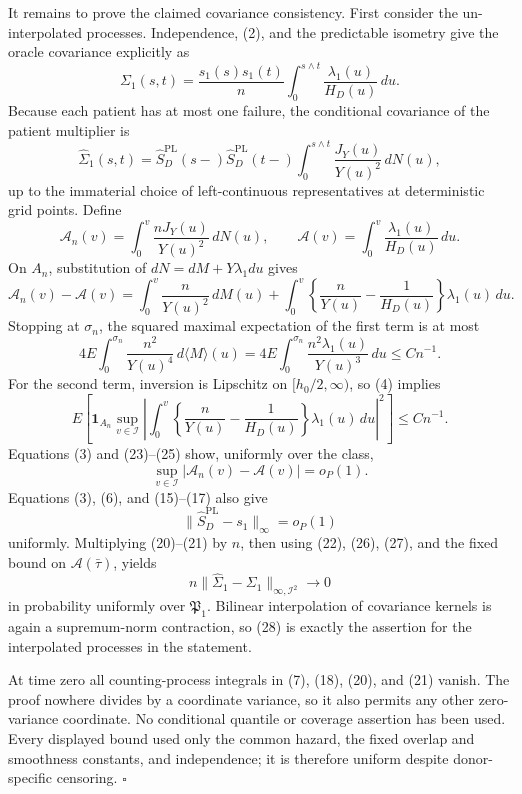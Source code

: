 It remains to prove the claimed covariance consistency.  First consider the un-interpolated processes.  Independence, (2), and the predictable isometry give the oracle covariance explicitly as
\[
 \Sigma_1(s,t)
 =\frac{s_1(s)s_1(t)}n
   \int_0^{s\wedge t}\frac{\lambda_1(u)}{H_D(u)}\,du.  \tag{20}
\]
Because each patient has at most one failure, the conditional covariance of the patient multiplier is
\[
 \widehat\Sigma_1(s,t)
 =\widehat S_D^{\mathrm{PL}}(s-)
  \widehat S_D^{\mathrm{PL}}(t-)
  \int_0^{s\wedge t}\frac{J_Y(u)}{Y(u)^2}\,dN(u),     \tag{21}
\]
up to the immaterial choice of left-continuous representatives at deterministic grid points.  Define
\[
 \mathcal A_n(v)=\int_0^v\frac{nJ_Y(u)}{Y(u)^2}\,dN(u),
 \qquad
 \mathcal A(v)=\int_0^v\frac{\lambda_1(u)}{H_D(u)}\,du. \tag{22}
\]
On \(A_n\), substitution of \(dN=dM+Y\lambda_1du\) gives
\[
 \mathcal A_n(v)-\mathcal A(v)
 =\int_0^v\frac n{Y(u)^2}\,dM(u)
  +\int_0^v\left\{\frac n{Y(u)}-\frac1{H_D(u)}\right\}
       \lambda_1(u)\,du.                               \tag{23}
\]
Stopping at \(\sigma_n\), the squared maximal expectation of the first term is at most
\[
 4E\int_0^{\sigma_n}\frac{n^2}{Y(u)^4}
       \,d\langle M\rangle(u)
 =4E\int_0^{\sigma_n}\frac{n^2\lambda_1(u)}{Y(u)^3}\,du
 \le Cn^{-1}.                                          \tag{24}
\]
For the second term, inversion is Lipschitz on
\([h_0/2,\infty)\), so (4) implies
\[
 E\left[\mathbf 1_{A_n}
 \sup_{v\in\mathcal I}
 \left|\int_0^v
 \left\{\frac n{Y(u)}-\frac1{H_D(u)}\right\}
 \lambda_1(u)\,du\right|^2\right]
 \le Cn^{-1}.                                          \tag{25}
\]
Equations (3) and (23)--(25) show, uniformly over the class,
\[
 \sup_{v\in\mathcal I}|\mathcal A_n(v)-\mathcal A(v)|=o_P(1). \tag{26}
\]
Equations (3), (6), and (15)--(17) also give
\[
 \|\widehat S_D^{\mathrm{PL}}-s_1\|_\infty=o_P(1)    \tag{27}
\]
uniformly.  Multiplying (20)--(21) by \(n\), then using (22), (26), (27), and the fixed bound on \(\mathcal A(\bar\tau)\), yields
\[
 n\|\widehat\Sigma_1-\Sigma_1\|_{\infty,\mathcal I^2}
 \longrightarrow0                                     \tag{28}
\]
in probability uniformly over \(\mathfrak P_1\).  Bilinear interpolation of covariance kernels is again a supremum-norm contraction, so (28) is exactly the assertion for the interpolated processes in the statement.

At time zero all counting-process integrals in (7), (18), (20), and (21) vanish.  The proof nowhere divides by a coordinate variance, so it also permits any other zero-variance coordinate.  No conditional quantile or coverage assertion has been used.  Every displayed bound used only the common hazard, the fixed overlap and smoothness constants, and independence; it is therefore uniform despite donor-specific censoring. \(\square\)